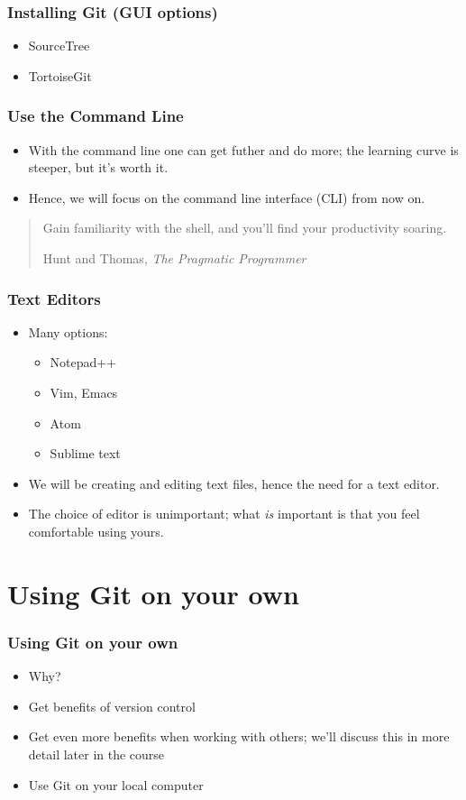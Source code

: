 \documentclass{git_course}
\begin{document}
\begin{frame}
\frametitle{Installing Git (GUI options)}
\begin{itemize}
    \item SourceTree
    \item TortoiseGit
\end{itemize}
\end{frame}

\begin{frame}
\frametitle{Use the Command Line}
\begin{itemize}
    \item With the command line one can get futher and do more; the
        learning curve is steeper, but it's worth it.
    \item Hence, we will focus on the command line interface (CLI) from now
        on.
\end{itemize}
    \blockquote[Hunt and Thomas, \emph{The Pragmatic Programmer}]
    {Gain familiarity with the shell, and you'll find your productivity soaring.}
\end{frame}

\begin{frame}
\frametitle{Text Editors}
\begin{itemize}
    \item Many options:
    \begin{itemize}
        \item Notepad++
        \item Vim, Emacs
        \item Atom
        \item Sublime text
    \end{itemize}
    \item We will be creating and editing text files, hence the need for a
        text editor.
    \item The choice of editor is unimportant; what \emph{is} important is
        that you feel comfortable using yours.
\end{itemize}
\end{frame}

\section{Using Git on your own}

\begin{frame}
\frametitle{Using Git on your own}
\begin{itemize}
    \item Why?
    \item Get benefits of version control
    \item Get even more benefits when working with others; we'll discuss
        this in more detail later in the course
    \item Use Git on your local computer
\end{itemize}
\end{frame}
\end{document}
